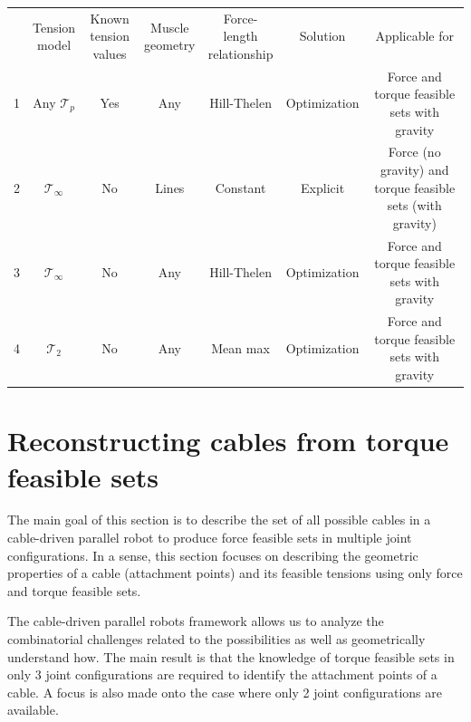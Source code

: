 \begin{table}[!ht]
    \begin{tabular}{ccccccc}
     & \makecell{Tension \\ model} & \makecell{Known \\ tension values} & \makecell{Muscle \\ geometry} & \makecell{Force-length \\ relationship} & Solution & Applicable for                                             \\
    1       & Any $\mathcal{T}_p$         & Yes                  & Any             & Hill-Thelen               & Optimization & Force and torque feasible sets with gravity                \\
    2       & $\mathcal{T}_{\infty}$     & No                   & Lines    & Constant                  & Explicit     & Force (no gravity) and torque feasible sets (with gravity) \\
    3       & $\mathcal{T}_{\infty}$    & No                   & Any             & Hill-Thelen               & Optimization & Force and torque feasible sets with gravity                \\
    4       & $\mathcal{T}_2$          & No                   & Any             & Mean max & Optimization & Force and torque feasible sets with gravity               
    \end{tabular}
\end{table}

\section{Reconstructing cables from torque feasible sets}

The main goal of this section is to describe the set of all possible cables in a cable-driven parallel robot to produce force feasible sets in multiple joint configurations. In a sense, this section focuses on describing the geometric properties of a cable (attachment points) and its feasible tensions using only force and torque feasible sets.

The cable-driven parallel robots framework allows us to analyze the combinatorial challenges related to the possibilities as well as geometrically understand how. The main result is that the knowledge of torque feasible sets in only 3 joint configurations are required to identify the attachment points of a cable. A focus is also made onto the case where only 2 joint configurations are available.

